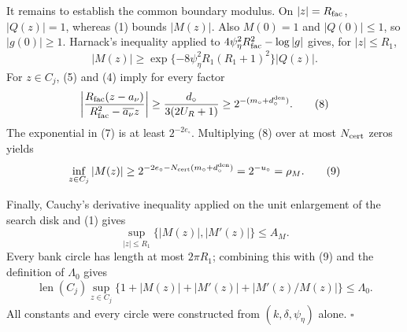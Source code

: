 It remains to establish the common boundary modulus.  On
\(|z|=R_{\rm fac}\), \(|Q(z)|=1\), whereas (1) bounds \(|M(z)|\).
Also \(M(0)=1\) and \(|Q(0)|\le1\), so \(|g(0)|\ge1\).
Harnack's inequality applied to
\(4\psi_\eta^2R_{\rm fac}^2-\log|g|\) gives, for \(|z|\le R_1\),
\[
 |M(z)|\ge
 \exp\{-8\psi_\eta^2R_1(R_1+1)^2\}|Q(z)|. \tag{7}
\]
For \(z\in C_j\), (5) and (4) imply for every factor
\[
 \left|
 \frac{R_{\rm fac}(z-a_\nu)}
 {R_{\rm fac}^2-\overline{a_\nu}z}
 \right|
 \ge\frac{d_\circ}{3(2U_R+1)}
 \ge2^{-(m_\circ+d_\circ^{\rm den})}. \tag{8}
\]
The exponential in (7) is at least \(2^{-2e_\circ}\).  Multiplying (8) over at most \(N_{\rm cert}\) zeros yields
\[
 \inf_{z\in C_j}|M(z)|
 \ge2^{-2e_\circ-N_{\rm cert}(m_\circ+d_\circ^{\rm den})}
 =2^{-u_\circ}=\rho_M. \tag{9}
\]

Finally, Cauchy's derivative inequality applied on the unit enlargement of the search disk and (1) gives
\[
 \sup_{|z|\le R_1}\{|M(z)|,|M'(z)|\}\le A_M.
\]
Every bank circle has length at most \(2\pi R_1\); combining this with (9) and the definition of \(\Lambda_0\) gives
\[
 \operatorname{len}(C_j)\sup_{z\in C_j}
 \{1+|M(z)|+|M'(z)|+|M'(z)/M(z)|\}\le\Lambda_0.
\]
All constants and every circle were constructed from
\((k,\delta,\psi_\eta)\) alone. \(\square\)